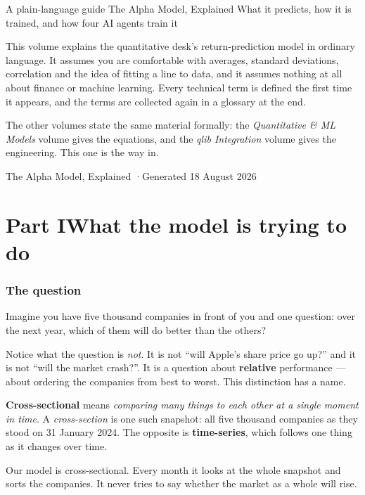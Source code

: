 \documentclass[11pt]{article}
\begin{document}
\mzqatitlepage
  {A plain-language guide}
  {The Alpha Model, Explained}
  {What it predicts, how it is trained, and how four AI agents train it}
  {This volume explains the quantitative desk's return-prediction model in ordinary
   language. It assumes you are comfortable with averages, standard deviations,
   correlation and the idea of fitting a line to data, and it assumes nothing at all
   about finance or machine learning. Every technical term is defined the first time
   it appears, and the terms are collected again in a glossary at the end.

   The other volumes state the same material formally: the \emph{Quantitative \& ML
   Models} volume gives the equations, and the \emph{qlib Integration} volume gives
   the engineering. This one is the way in.}
  {The Alpha Model, Explained \quad·\quad Generated 18 August 2026}

\mzqatoc
\clearpage

\part*{Part I\quad What the model is trying to do}

\section{The question}

Imagine you have five thousand companies in front of you and one question: over the
next year, which of them will do better than the others?

Notice what the question is \emph{not}. It is not ``will Apple's share price go up?''
and it is not ``will the market crash?''. It is a question about \textbf{relative}
performance --- about ordering the companies from best to worst. This distinction has
a name.

\begin{specbox}
\textbf{Cross-sectional} means \emph{comparing many things to each other at a single
moment in time}. A \emph{cross-section} is one such snapshot: all five thousand
companies as they stood on 31 January 2024. The opposite is \textbf{time-series},
which follows one thing as it changes over time.

Our model is cross-sectional. Every month it looks at the whole snapshot and sorts
the companies. It never tries to say whether the market as a whole will rise.
\end{specbox}
\end{document}
